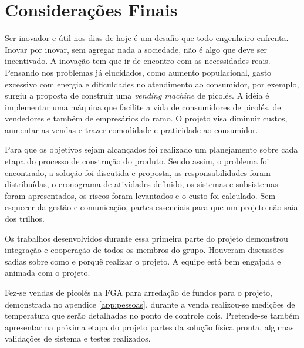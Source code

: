 \chapter{Considerações Finais}


Ser inovador e útil nos dias de hoje é um desafio que todo engenheiro enfrenta. Inovar por inovar, sem agregar nada a sociedade, não é algo que deve ser incentivado. A inovação tem que ir de encontro com as necessidades reais. Pensando nos problemas já elucidados, como aumento populacional, gasto excessivo com energia e dificuldades no atendimento ao consumidor, por exemplo, surgiu a  proposta de construir uma  \textit{vending machine} de picolés.  A idéia é implementar uma máquina que facilite a vida de consumidores de picolés, de vendedores  e também de empresários do ramo. O projeto visa diminuir custos, aumentar as vendas e trazer comodidade e praticidade ao consumidor. 

Para que os objetivos sejam alcançados foi realizado um planejamento sobre cada etapa do processo de construção do produto. Sendo assim, o problema foi encontrado, a solução foi discutida e proposta, as responsabilidades foram distribuídas, o cronograma de atividades definido, os sistemas e subsistemas foram apresentados, os riscos foram levantados e o custo foi calculado. Sem esquecer da gestão e comunicação, partes essenciais para que um projeto não saia dos trilhos. 

Os trabalhos desenvolvidos durante essa primeira parte do projeto demonstrou integração e cooperação de todos os membros do grupo. Houveram discussões sadias sobre como e porquê realizar o projeto. A equipe está bem engajada e animada com o projeto. 

Fez-se vendas de picolés na FGA para arredação de fundos para o projeto, demonstrada no apendice \ref{app:pessoas}, durante a venda realizou-se medições de temperatura que serão detalhadas no ponto de controle dois. Pretende-se também apresentar na próxima etapa do projeto partes da solução física pronta, algumas validações de sistema e testes realizados.





